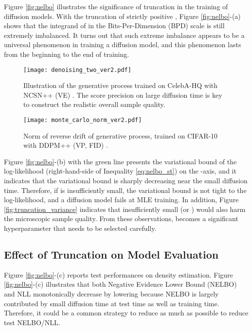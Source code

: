 \documentclass[nohyperref]{article}
\theoremstyle{plain}
\theoremstyle{definition}
\theoremstyle{remark}
\begin{document}
Figure \ref{fig:nelbo} illustrates the significance of truncation in the training of diffusion models. With the truncation of strictly positive , Figure \ref{fig:nelbo}-(a) shows that the integrand of  in the Bits-Per-Dimension (BPD) scale is still extremely imbalanced. It turns out that such extreme imbalance appears to be a universal phenomenon in training a diffusion model, and this phenomenon lasts from the beginning to the end of training.

\begin{figure}[t]
	\centering
		\texttt{[image: denoising\_two\_ver2.pdf]}
	\caption{Illustration of the generative process trained on CelebA-HQ  with NCSN++ (VE) \cite{song2020score}. The score precision on large diffusion time is key to construct the realistic overall sample quality.}
	\label{fig:large_diffusion_time}
\end{figure}

\begin{figure}[t]
\centering
\texttt{[image: monte\_carlo\_norm\_ver2.pdf]}
\caption{Norm of reverse drift of generative process, trained on CIFAR-10 with DDPM++ (VP, FID) \cite{song2020score}.}
\label{fig:monte_carlo_norm}
\end{figure}

Figure \ref{fig:nelbo}-(b) with the green line presents the variational bound of the log-likelihood (right-hand-side of Inequality \eqref{eq:nelbo_st}) on the -axis, and it indicates that the variational bound is sharply decreasing near the small diffusion time. Therefore, if  is insufficiently small, the variational bound is not tight to the log-likelihood, and a diffusion model fails at MLE training. In addition, Figure \ref{fig:truncation_variance} indicates that insufficiently small  (or ) would also harm the microscopic sample quality. From these observations,  becomes a significant hyperparameter that needs to be selected carefully.

\subsection{Effect of Truncation on Model Evaluation}

Figure \ref{fig:nelbo}-(c) reports test performances on density estimation. Figure \ref{fig:nelbo}-(c) illustrates that both Negative Evidence Lower Bound (NELBO) and NLL monotonically decrease by lowering  because NELBO is largely contributed by small diffusion time at test time as well as training time. Therefore, it could be a common strategy to reduce  as much as possible to reduce test NELBO/NLL. 
\end{document}
